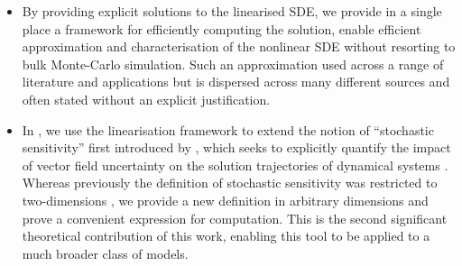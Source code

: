 \begin{itemize}
\begin{itemize}
		      \item By providing explicit solutions to the linearised SDE, we provide in a single place a framework for efficiently computing the solution, enable efficient approximation and characterisation of the nonlinear SDE without resorting to bulk Monte-Carlo simulation.
		            Such an approximation used across a range of literature and applications \citep{Jazwinski_2014_StochasticProcessesFiltering,SarkkaSolin_2019_AppliedStochasticDifferential,KaszasHaller_2020_UniversalUpperEstimate,ArchambeauEtAl_2007_GaussianProcessApproximations,Sanz-AlonsoStuart_2017_GaussianApproximationsSmall,LawEtAl_2015_DataAssimilationMathematical,ReichCotter_2015_ProbabilisticForecastingBayesian,BudhirajaEtAl_2019_AssimilatingDataModels} but is dispersed across many different sources and often stated without an explicit justification.


		      \item In , we use the linearisation framework to extend the notion of ``stochastic sensitivity'' first introduced by \citet{Balasuriya_2020_StochasticSensitivityComputable}, which seeks to explicitly quantify the impact of vector field uncertainty on the solution trajectories of dynamical systems \citep{BranickiUda_2021_LagrangianUncertaintyQuantification,KaszasHaller_2020_UniversalUpperEstimate,BranickiUda_2023_PathBasedDivergenceRates,Balibrea-IniestaEtAl_2016_LagrangianDescriptorsStochastic}.
		            Whereas previously the definition of stochastic sensitivity was restricted to two-dimensions \citep{Balasuriya_2020_StochasticSensitivityComputable}, we provide a new definition in arbitrary dimensions and prove a convenient expression for computation.
		            This is the second significant theoretical contribution of this work, enabling this tool to be applied to a much broader class of models.


\end{itemize}
\end{itemize}
